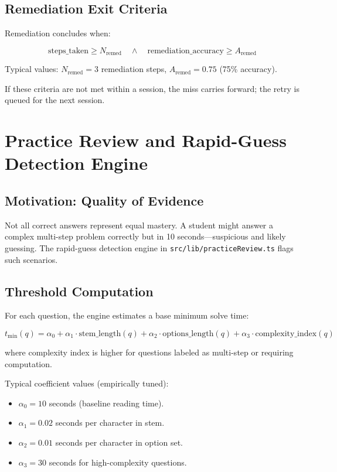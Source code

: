 \documentclass[sigconf,authordraft,twoside]{acmart}
\newcommand{\tech}[1]{\textcolor{brandblue}{\nolinkurl{#1}}}
\begin{document}
\subsection{Remediation Exit Criteria}

Remediation concludes when:

\begin{equation}
\text{steps\_taken} \geq N_{\text{remed}} \quad \land \quad \text{remediation\_accuracy} \geq A_{\text{remed}}
\end{equation}

Typical values: $N_{\text{remed}} = 3$ remediation steps, $A_{\text{remed}} = 0.75$ (75\% accuracy).

If these criteria are not met within a session, the miss carries forward; the retry is queued for the next session.

\section{Practice Review and Rapid-Guess Detection Engine}

\subsection{Motivation: Quality of Evidence}
Not all correct answers represent equal mastery. A student might answer a complex multi-step problem correctly but in 10 seconds---suspicious and likely guessing. The rapid-guess detection engine in \tech{src/lib/practiceReview.ts} flags such scenarios.

\subsection{Threshold Computation}
For each question, the engine estimates a base minimum solve time:

\begin{equation}
t_{\text{min}}(q) = \alpha_0 + \alpha_1 \cdot \text{stem\_length}(q) + \alpha_2 \cdot \text{options\_length}(q) + \alpha_3 \cdot \text{complexity\_index}(q)
\end{equation}

where complexity index is higher for questions labeled as multi-step or requiring computation.

Typical coefficient values (empirically tuned):
\begin{itemize}
\item $\alpha_0 = 10$ seconds (baseline reading time).
\item $\alpha_1 = 0.02$ seconds per character in stem.
\item $\alpha_2 = 0.01$ seconds per character in option set.
\item $\alpha_3 = 30$ seconds for high-complexity questions.
\end{itemize}
\end{document}

